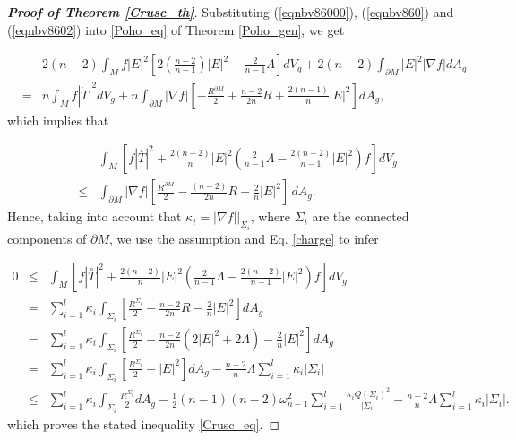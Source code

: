 \documentclass{amsart}
\numberwithin{equation}{section}
\begin{document}
\begin{proof}[{\bf Proof of Theorem \ref{Crusc_th}}]
			
			Substituting (\ref{eqnbv86000}), (\ref{eqnbv860}) and (\ref{eqnbv8602}) into \eqref{Poho_eq} of Theorem \ref{Poho_gen}, we get
	
	

		\begin{eqnarray*}
			& &2(n-2)\int_{M}f|E|^{2}\left[2\left(\frac{n-2}{n-1}\right)|E|^{2}-\frac{2}{n-1}\Lambda\right]dV_g+2(n-2)\int_{\partial M}|E|^{2}|\nabla f|dA_g\\
			&=&n\int_{M}f|\mathring{T}|^{2}dV_g+n\int_{\partial M}|\nabla f|\left[-\frac{R^{\partial M}}{2}+\frac{n-2}{2n}R+\frac{2(n-1)}{n}|E|^{2}\right]dA_g,
		\end{eqnarray*} which implies that
		
		\begin{eqnarray}
		&&\int_{M} \left[ f |\overset{\circ}{T}|^{2} + \frac{2(n-2)}{n} |E|^{2} \left( \frac{2}{n-1}\Lambda - \frac{2(n-2)}{n-1} |E|^{2} \right) f \right]dV_g\nonumber\\ &\leq & \int_{\partial M}|\nabla f|\left[ \frac{R^{\partial M}}{2}-\frac{(n-2)}{2n}R-\frac{2}{n}|E|^2\right]\,dA_{g}.
\end{eqnarray} Hence, taking into account that \( \kappa_{i} = |\nabla f| \big|_{\Sigma_{i}} \), where \( \Sigma_{i} \) are the connected components of \( \partial M \), we use the assumption and Eq. \eqref{charge} to infer
		
		\begin{eqnarray}\label{alan}
			0 &\leq& \int_{M} \left[ f |\overset{\circ}{T}|^{2} + \frac{2(n-2)}{n} |E|^{2} \left( \frac{2}{n-1}\Lambda - \frac{2(n-2)}{n-1} |E|^{2} \right) f \right]dV_g \nonumber\\
			&=& \sum_{i=1}^{l} \kappa_{i} \int_{\Sigma_{i}} \left[ \frac{R^{\Sigma_{i}}}{2} - \frac{n-2}{2n} R - \frac{2}{n} |E|^{2} \right]dA_g\\
			&=& \sum_{i=1}^{l} \kappa_{i} \int_{\Sigma_{i}} \left[ \frac{R^{\Sigma_{i}}}{2} - \frac{n-2}{2n}(2\vert E\vert^{2} +2\Lambda) - \frac{2}{n} |E|^{2} \right]dA_g\nonumber\\
			&=& \sum_{i=1}^{l} \kappa_{i} \int_{\Sigma_{i}} \left[ \frac{R^{\Sigma_{i}}}{2}  -  |E|^{2} \right]dA_g -\frac{n-2}{n}\Lambda\sum_{i=1}^{l} \kappa_{i}|\Sigma_i|\nonumber\\
			&\leq& \sum_{i=1}^{l} \kappa_{i} \int_{\Sigma_{i}}  \frac{R^{\Sigma_{i}}}{2}dA_g - \frac{1}{2}(n-1)(n-2)\omega^{2}_{n-1}\sum_{i=1}^{l}  \frac{\kappa_{i}Q(\Sigma_i)^2}{\vert\Sigma_i\vert} -\frac{n-2}{n}\Lambda\sum_{i=1}^{l} \kappa_{i}|\Sigma_i|.\nonumber
		\end{eqnarray}
		which proves the stated inequality \eqref{Crusc_eq}. 
		

\end{proof}
\end{document}
